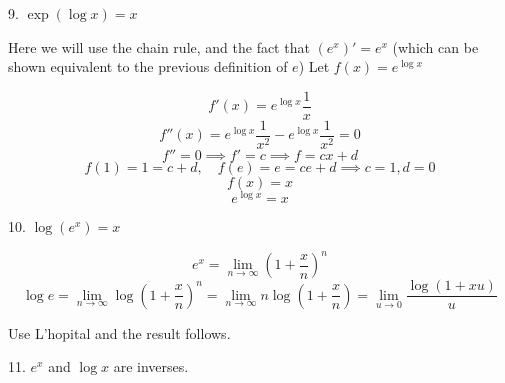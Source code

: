 \documentclass[11]{article}
\begin{document}
9. $\exp(\log x) = x$

Here we will use the chain rule, and the fact that $(e^x)' = e^x$ (which can be shown equivalent to the previous definition of $e$)
Let $f(x) = e^{\log x}$

$$f'(x) = e^{\log x} \frac1x$$
$$f''(x) = e^{\log x} \frac1{x^2} - e^{\log x} \frac1{x^2} = 0$$
$$f'' = 0 \implies f' = c \implies f = cx + d$$
$$f(1) = 1 = c + d, \quad f(e) = e = ce + d \implies c = 1, d =0$$ 
$$f(x) = x$$
$$e^{\log x} = x$$


10. $\log(e^x) =x $

$$e^x = \lim_{n \to \infty} \left(1 + \frac{x}n\right)^n$$
$$\log e = \lim_{n \to \infty} \log\left(1 + \frac{x}n\right)^n = \lim_{n \to \infty} n \log \left(1 + \frac{x}n\right) = \lim_{u \to 0} \frac{\log \left(1 + xu\right)}{u}$$

Use L'hopital and the result follows.

11. $e^x$ and $\log x$ are inverses.
\end{document}

